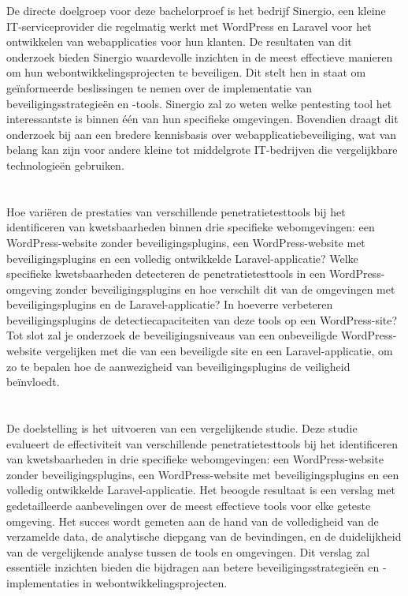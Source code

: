 De directe doelgroep voor deze bachelorproef is het bedrijf Sinergio, een kleine IT-serviceprovider die regelmatig 
werkt met WordPress en Laravel voor het ontwikkelen van webapplicaties voor hun klanten. De resultaten van dit 
onderzoek bieden Sinergio waardevolle inzichten in de meest effectieve manieren om hun webontwikkelingsprojecten 
te beveiligen. Dit stelt hen in staat om geïnformeerde beslissingen te nemen over de implementatie van 
beveiligingsstrategieën en -tools. Sinergio zal zo weten welke pentesting tool het interessantste is binnen één van hun specifieke omgevingen.
Bovendien draagt dit onderzoek bij aan een bredere kennisbasis over webapplicatiebeveiliging, 
wat van belang kan zijn voor andere kleine tot middelgrote IT-bedrijven die vergelijkbare technologieën gebruiken.

\section{}%
\label{sec:onderzoeksvraag}
Hoe variëren de prestaties van verschillende penetratietesttools bij het identificeren van kwetsbaarheden binnen drie 
specifieke webomgevingen: een WordPress-website zonder beveiligingsplugins, een WordPress-website met beveiligingsplugins 
en een volledig ontwikkelde Laravel-applicatie? Welke specifieke kwetsbaarheden detecteren de penetratietesttools in een WordPress-omgeving zonder 
beveiligingsplugins en hoe verschilt dit van de omgevingen met beveiligingsplugins en de Laravel-applicatie? 
In hoeverre verbeteren beveiligingsplugins de detectiecapaciteiten van deze tools op een WordPress-site? 
Tot slot zal je onderzoek de beveiligingsniveaus van een onbeveiligde WordPress-website vergelijken met die 
van een beveiligde site en een Laravel-applicatie, om zo te bepalen hoe de aanwezigheid van beveiligingsplugins de 
veiligheid beïnvloedt.

\section{}%
\label{sec:onderzoeksdoelstelling}
De doelstelling is het uitvoeren van een vergelijkende studie. Deze studie evalueert de effectiviteit van 
verschillende penetratietesttools bij het identificeren van kwetsbaarheden in drie specifieke webomgevingen: een WordPress-website 
zonder beveiligingsplugins, een WordPress-website met beveiligingsplugins en een volledig ontwikkelde Laravel-applicatie.
Het beoogde resultaat is een verslag met gedetailleerde aanbevelingen over de meest effectieve tools voor elke geteste 
omgeving. Het succes wordt gemeten aan de hand van de volledigheid van de verzamelde data, de analytische diepgang van de bevindingen, 
en de duidelijkheid van de vergelijkende analyse tussen de tools en omgevingen. Dit verslag zal essentiële inzichten bieden die 
bijdragen aan betere beveiligingsstrategieën en -implementaties in webontwikkelingsprojecten.
